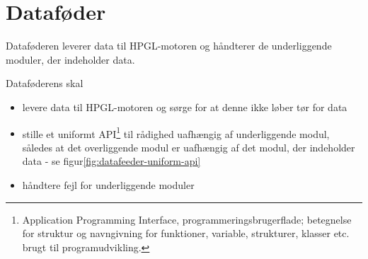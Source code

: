 \section[Dataføder (med SPI og SD-/MMC-kort)]{Dataføder}


Dataføderen leverer data til HPGL-motoren og håndterer de
underliggende moduler, der indeholder data.

Dataføderens skal
\begin{itemize} \firmlist
\item levere data til HPGL-motoren og sørge for at denne ikke løber
  tør for data
\item stille et uniformt API\footnote{Application Programming
    Interface, programmeringsbrugerflade; betegnelse for struktur og
    navngivning for funktioner, variable, strukturer, klasser
    etc. brugt til programudvikling.} til rådighed uafhængig af underliggende modul,
  således at det overliggende modul er uafhængig af det modul, der
  indeholder data - se figur\vref{fig:datafeeder-uniform-api}
\item håndtere fejl for underliggende moduler
\end{itemize}


